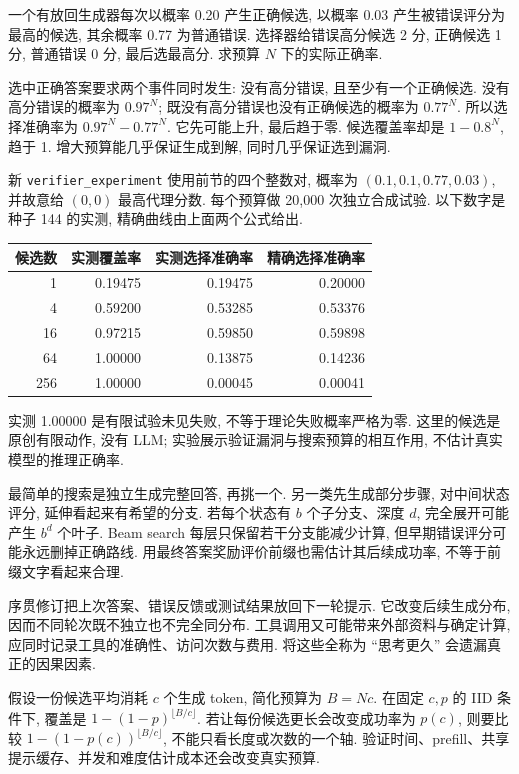 \begin{example}
一个有放回生成器每次以概率 0.20 产生正确候选, 以概率 0.03 产生被错误评分为最高的候选, 其余概率 0.77 为普通错误. 选择器给错误高分候选 2 分, 正确候选 1 分, 普通错误 0 分, 最后选最高分. 求预算 $N$ 下的实际正确率.
\end{example}
\begin{solution}
选中正确答案要求两个事件同时发生: 没有高分错误, 且至少有一个正确候选. 没有高分错误的概率为 $0.97^N$; 既没有高分错误也没有正确候选的概率为 $0.77^N$. 所以选择准确率为 $0.97^N-0.77^N$. 它先可能上升, 最后趋于零. 候选覆盖率却是 $1-0.8^N$, 趋于 1. 增大预算能几乎保证生成到解, 同时几乎保证选到漏洞.
\end{solution}
新 \texttt{verifier\_experiment} 使用前节的四个整数对, 概率为 $(0.1,0.1,0.77,0.03)$, 并故意给 $(0,0)$ 最高代理分数. 每个预算做 20,000 次独立合成试验. 以下数字是种子 144 的实测, 精确曲线由上面两个公式给出.
\begin{center}
\begin{tabular}{rrrr}
\toprule
候选数 & 实测覆盖率 & 实测选择准确率 & 精确选择准确率\\
\midrule
1 & 0.19475 & 0.19475 & 0.20000\\
4 & 0.59200 & 0.53285 & 0.53376\\
16 & 0.97215 & 0.59850 & 0.59898\\
64 & 1.00000 & 0.13875 & 0.14236\\
256 & 1.00000 & 0.00045 & 0.00041\\
\bottomrule
\end{tabular}
\end{center}
实测 1.00000 是有限试验未见失败, 不等于理论失败概率严格为零. 这里的候选是原创有限动作, 没有 LLM; 实验展示验证漏洞与搜索预算的相互作用, 不估计真实模型的推理正确率.

\label{sec:reason-budget}
最简单的搜索是独立生成完整回答, 再挑一个. 另一类先生成部分步骤, 对中间状态评分, 延伸看起来有希望的分支. 若每个状态有 $b$ 个子分支、深度 $d$, 完全展开可能产生 $b^d$ 个叶子. Beam search 每层只保留若干分支能减少计算, 但早期错误评分可能永远删掉正确路线. 用最终答案奖励评价前缀也需估计其后续成功率, 不等于前缀文字看起来合理.

序贯修订把上次答案、错误反馈或测试结果放回下一轮提示. 它改变后续生成分布, 因而不同轮次既不独立也不完全同分布. 工具调用又可能带来外部资料与确定计算, 应同时记录工具的准确性、访问次数与费用. 将这些全称为 ``思考更久'' 会遗漏真正的因果因素.

假设一份候选平均消耗 $c$ 个生成 token, 简化预算为 $B=Nc$. 在固定 $c,p$ 的 IID 条件下, 覆盖是 $1-(1-p)^{\lfloor B/c\rfloor}$. 若让每份候选更长会改变成功率为 $p(c)$, 则要比较 $1-(1-p(c))^{\lfloor B/c\rfloor}$, 不能只看长度或次数的一个轴. 验证时间、prefill、共享提示缓存、并发和难度估计成本还会改变真实预算.

